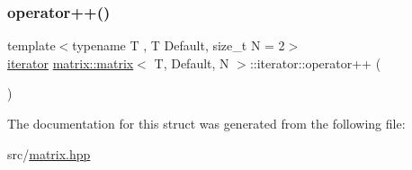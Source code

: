 \subsubsection{\texorpdfstring{operator++()}{operator++()}}
{\footnotesize\ttfamily template$<$typename T , T Default, size\+\_\+t N = 2$>$ \\
\hyperlink{structmatrix_1_1matrix_1_1iterator}{iterator} \hyperlink{structmatrix_1_1matrix}{matrix\+::matrix}$<$ T, Default, N $>$\+::iterator\+::operator++ (\begin{DoxyParamCaption}{ }\end{DoxyParamCaption})\hspace{0.3cm}{\ttfamily [inline]}}



The documentation for this struct was generated from the following file\+:\begin{DoxyCompactItemize}
\item 
src/\hyperlink{matrix_8hpp}{matrix.\+hpp}\end{DoxyCompactItemize}
